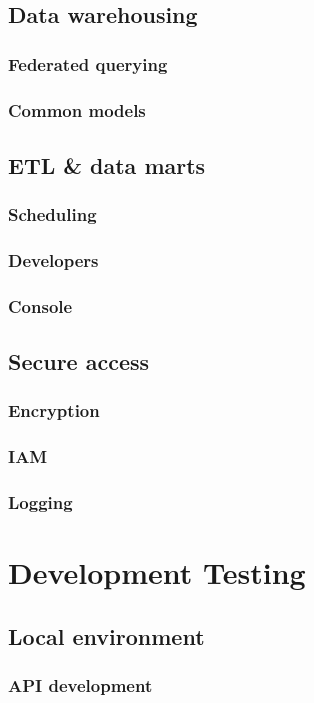 \documentclass[10pt]{article}
\begin{document}
\subsection{Data warehousing}
\subsubsection{Federated querying}
\subsubsection{Common models}

\subsection{ETL \& data marts}
\subsubsection{Scheduling}
\subsubsection{Developers}
\subsubsection{Console}

\subsection{Secure access}
\subsubsection{Encryption}
\subsubsection{IAM}
\subsubsection{Logging}

\newpage
\section{Development Testing}
\subsection{Local environment}
\subsubsection{API development}
\end{document}
